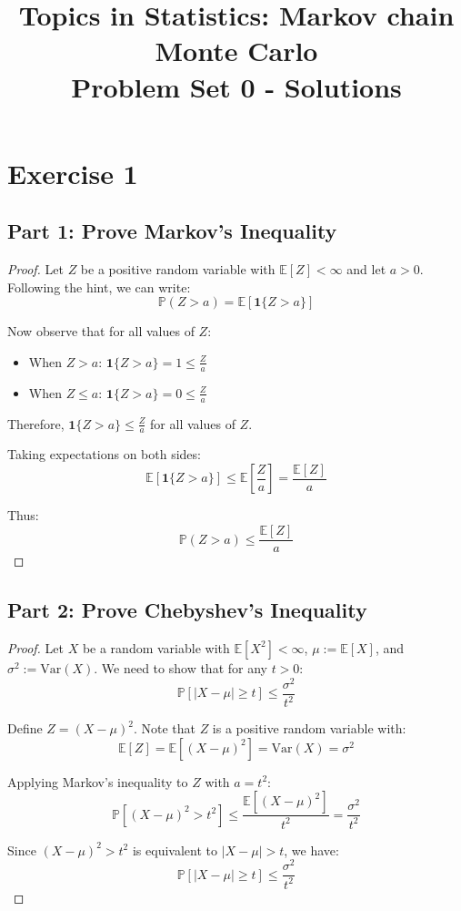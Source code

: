 \documentclass[12pt]{article}
\title{Topics in Statistics: Markov chain Monte Carlo\\
Problem Set 0 - Solutions}
\author{}
\date{}
\begin{document}
\maketitle

\section*{Exercise 1}

\subsection*{Part 1: Prove Markov's Inequality}

\begin{proof}
Let $Z$ be a positive random variable with $\mathbb{E}[Z] < \infty$ and let $a > 0$. Following the hint, we can write:
\[
\mathbb{P}(Z > a) = \mathbb{E}[\mathbf{1}\{Z > a\}]
\]

Now observe that for all values of $Z$:
\begin{itemize}
    \item When $Z > a$: $\mathbf{1}\{Z > a\} = 1 \leq \frac{Z}{a}$
    \item When $Z \leq a$: $\mathbf{1}\{Z > a\} = 0 \leq \frac{Z}{a}$
\end{itemize}

Therefore, $\mathbf{1}\{Z > a\} \leq \frac{Z}{a}$ for all values of $Z$.

Taking expectations on both sides:
\[
\mathbb{E}[\mathbf{1}\{Z > a\}] \leq \mathbb{E}\left[\frac{Z}{a}\right] = \frac{\mathbb{E}[Z]}{a}
\]

Thus:
\[
\boxed{\mathbb{P}(Z > a) \leq \frac{\mathbb{E}[Z]}{a}}
\]
\end{proof}

\subsection*{Part 2: Prove Chebyshev's Inequality}

\begin{proof}
Let $X$ be a random variable with $\mathbb{E}[X^2] < \infty$, $\mu := \mathbb{E}[X]$, and $\sigma^2 := \text{Var}(X)$. We need to show that for any $t > 0$:
\[
\mathbb{P}[|X - \mu| \geq t] \leq \frac{\sigma^2}{t^2}
\]

Define $Z = (X - \mu)^2$. Note that $Z$ is a positive random variable with:
\[
\mathbb{E}[Z] = \mathbb{E}[(X - \mu)^2] = \text{Var}(X) = \sigma^2
\]

Applying Markov's inequality to $Z$ with $a = t^2$:
\[
\mathbb{P}[(X - \mu)^2 > t^2] \leq \frac{\mathbb{E}[(X - \mu)^2]}{t^2} = \frac{\sigma^2}{t^2}
\]

Since $(X - \mu)^2 > t^2$ is equivalent to $|X - \mu| > t$, we have:
\[
\boxed{\mathbb{P}[|X - \mu| \geq t] \leq \frac{\sigma^2}{t^2}}
\]
\end{proof}
\end{document}
